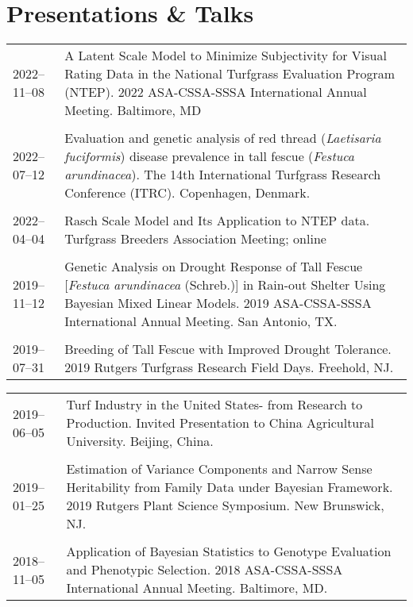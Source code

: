 \documentclass[letterpaper,11pt, english]{article}
\begin{document}
\section{Presentations \& Talks}
\begin{flushleft}
  \begin{tabularx}{\textwidth}{@{}lX@{}}
    2022--11--08 \hspace{1cm} & A Latent Scale Model to Minimize Subjectivity for Visual Rating Data in the National Turfgrass Evaluation Program (NTEP). 2022 ASA-CSSA-SSSA International Annual Meeting. Baltimore, MD \\
    \\[-0.2cm] 
    2022--07--12 \hspace{1cm} & Evaluation and genetic analysis of red thread (\textit{Laetisaria fuciformis}) disease prevalence in tall fescue (\textit{Festuca arundinacea}). The 14th International Turfgrass Research Conference (ITRC). Copenhagen, Denmark. \\
    \\[-0.2cm]
    2022--04--04 \hspace{1cm} & Rasch Scale Model and Its Application to NTEP data. Turfgrass Breeders Association Meeting; online \\
    \\[-0.2cm]
    2019--11--12 \hspace{1cm} & Genetic Analysis on Drought Response of Tall Fescue [\textit{Festuca arundinacea} (Schreb.)] in Rain-out Shelter Using Bayesian Mixed Linear Models. 2019 ASA-CSSA-SSSA International Annual Meeting. San Antonio, TX. \\
    \\[-0.2cm]
    2019--07--31 \hspace{1cm} & Breeding of Tall Fescue with Improved Drought Tolerance. 2019 Rutgers Turfgrass Research Field Days. Freehold, NJ. \\

  \end{tabularx}
\end{flushleft}
\begin{flushleft}
    \begin{tabularx}{\textwidth}{@{}lX@{}}
    2019--06--05 \hspace{1cm} & Turf Industry in the United States- from Research to Production. Invited Presentation to China Agricultural University. Beijing, China. \\
    \\[-0.2cm]
    2019--01--25 \hspace{1cm} & Estimation of Variance Components and Narrow Sense Heritability from Family Data under Bayesian Framework. 2019 Rutgers Plant Science Symposium. New Brunswick, NJ. \\
    \\[-0.2cm]
    2018--11--05 \hspace{1cm} & Application of Bayesian Statistics to Genotype Evaluation and Phenotypic Selection. 2018 ASA-CSSA-SSSA International Annual Meeting. Baltimore, MD. \\
  \end{tabularx}
\end{flushleft}
\end{document}
